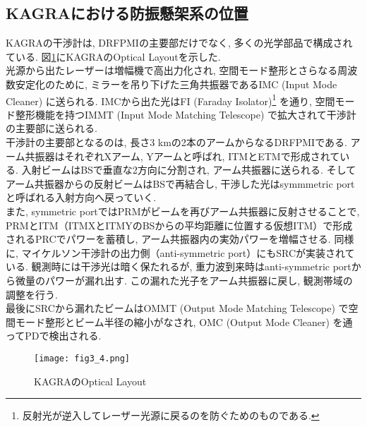 \subsection{KAGRAにおける防振懸架系の位置}
KAGRAの干渉計は, DRFPMIの主要部だけでなく, 多くの光学部品で構成されている. 図\ref{fig3.4}にKAGRAのOptical Layoutを示した. \\
\quad 光源から出たレーザーは増幅機で高出力化され, 空間モード整形とさらなる周波数安定化のために, ミラーを吊り下げた三角共振器であるIMC (Input Mode Cleaner) に送られる. IMCから出た光はFI (Faraday Isolator)\footnote{反射光が逆入してレーザー光源に戻るのを防ぐためのものである. } を通り, 空間モード整形機能を持つIMMT (Input Mode Matching Telescope) で拡大されて干渉計の主要部に送られる. \\
\quad 干渉計の主要部となるのは, 長さ3 kmの2本のアームからなるDRFPMIである. アーム共振器はそれぞれXアーム, Yアームと呼ばれ, ITMとETMで形成されている. 入射ビームはBSで垂直な2方向に分割され, アーム共振器に送られる. そしてアーム共振器からの反射ビームはBSで再結合し, 干渉した光はsymmmetric portと呼ばれる入射方向へ戻っていく. \\
\quad また, symmetric portではPRMがビームを再びアーム共振器に反射させることで, PRMとITM（ITMXとITMYのBSからの平均距離に位置する仮想ITM）で形成されるPRCでパワーを蓄積し, アーム共振器内の実効パワーを増幅させる. 同様に, マイケルソン干渉計の出力側（anti-symmetric port）にもSRCが実装されている. 観測時には干渉光は暗く保たれるが, 重力波到来時はanti-symmetric portから微量のパワーが漏れ出す. この漏れた光子をアーム共振器に戻し, 観測帯域の調整を行う. \\
\quad 最後にSRCから漏れたビームはOMMT (Output Mode Matching Telescope) で空間モード整形とビーム半径の縮小がなされ, OMC (Output Mode Cleaner) を通ってPDで検出される. 
\begin{figure}[H]
\begin{center}
\texttt{[image: fig3\_4.png]}
\caption[KAGRAのOptical Layout]{KAGRAのOptical Layout}
\label{fig3.4}
\end{center}
\end{figure}
